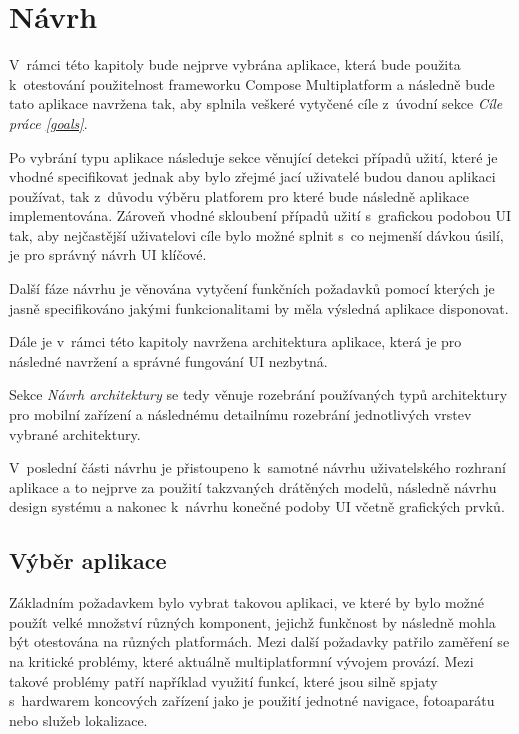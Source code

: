 \chapter{Návrh}
V~rámci této kapitoly bude nejprve vybrána aplikace, která bude použita k~otestování použitelnost frameworku Compose Multiplatform a následně
bude tato aplikace navržena tak, aby splnila veškeré vytyčené cíle z~úvodní sekce \textit{Cíle práce \ref{goals}}.

Po vybrání typu aplikace následuje sekce věnující detekci případů užití, které je vhodné specifikovat jednak aby bylo zřejmé jací 
uživatelé budou danou aplikaci používat, tak z~důvodu výběru platforem pro které bude následně aplikace implementována. %
Zároveň vhodné skloubení případů užití s~grafickou podobou UI tak, aby nejčastější uživatelovi cíle bylo možné splnit s~co nejmenší dávkou úsilí, 
je pro správný návrh UI klíčové. 


Další fáze návrhu je věnována vytyčení funkčních požadavků pomocí kterých je jasně specifikováno jakými funkcionalitami by měla výsledná 
aplikace disponovat. 

Dále je v~rámci této kapitoly navržena architektura aplikace, která je pro následné navržení a správné fungování UI nezbytná. 

Sekce \textit{Návrh architektury} se tedy věnuje rozebrání používaných typů architektury pro mobilní zařízení a následnému detailnímu
rozebrání jednotlivých vrstev vybrané architektury.

V~poslední části návrhu je přistoupeno k~samotné návrhu uživatelského rozhraní aplikace a to nejprve za použití takzvaných drátěných modelů,
následně návrhu design systému a nakonec k~návrhu konečné podoby UI včetně grafických prvků.


\section{Výběr aplikace}
Základním požadavkem bylo vybrat takovou aplikaci, ve které by bylo možné použít velké množství různých komponent, jejichž funkčnost by následně mohla být otestována
na různých platformách.
Mezi další požadavky patřilo zaměření se na kritické problémy, které aktuálně multiplatformní vývojem provází. 
Mezi takové problémy patří například využití funkcí, které jsou silně spjaty s~hardwarem koncových zařízení jako je použití jednotné navigace, fotoaparátu 
nebo služeb lokalizace.

